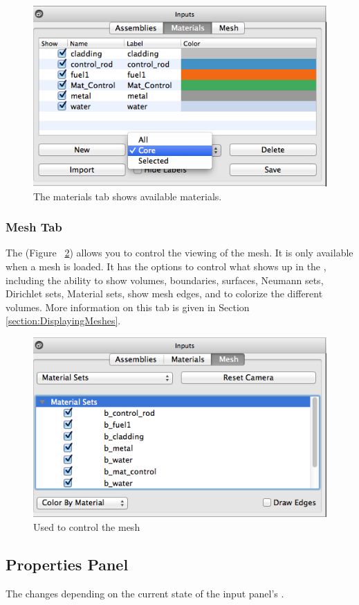 \begin{figure}[h]
	\begin{center}
		\includegraphics[width=0.5\linewidth]{Images/materials-tab.png}
		\caption{The materials tab shows available materials.}
		\label{fig:mainwindow3}
	\end{center}
\end{figure}

\subsubsection{Mesh Tab}
The  (Figure ~\ref{fig:mainwindow4}) allows you to control the viewing of the mesh.  It is only available when a mesh is loaded.  It has the options to control what shows up in the , including the ability to show volumes, boundaries, surfaces, Neumann sets, Dirichlet sets, Material sets, show mesh edges, and to colorize the different volumes.  More information on this tab is given in Section \ref{section:DisplayingMeshes}.

\begin{figure}[h]
	\begin{center}
		\includegraphics[width=0.5\linewidth]{Images/mash-tab.png}
		\caption{Used to control the mesh}
		\label{fig:mainwindow4}
	\end{center}
\end{figure}

\subsection{Properties Panel}
The  changes depending on the current state of the input panel's .

